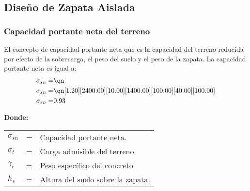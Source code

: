 \documentclass{article}%
\begin{document}
\subsection{Diseño de Zapata Aislada}%
\label{subsec:DiseodeZapataAislada}%

%
\subsubsection{Capacidad portante neta del terreno}

    El concepto de capacidad portante neta que es la capacidad del terreno reducida por efecto de la sobrecarga, el peso del suelo y el peso de la zapata. La capacidad portante neta es igual a:
    \begin{align}
        \sigma_{sn} =&\qn \\
        \sigma_{sn} =&\qn[1.20][2400.00][10.00][1400.00][100.00][40.00][100.00]\\
        \sigma_{sn} =& 0.93
    \end{align}

    \textbf{Donde:}

    \begin{table}[h!]
        \centering
        \begin{tabular}{lll}
            $\sigma_{sn}$ &=&    Capacidad portante neta.\\
            $\sigma_t$ &=&   Carga admisible del terreno.\\
            $\gamma_c$ &=&    Peso específico del concreto\\
            $h_s$ &=&   Altura del suelo sobre la zapata.\\
        \end{tabular}
    \end{table}
\end{document}
